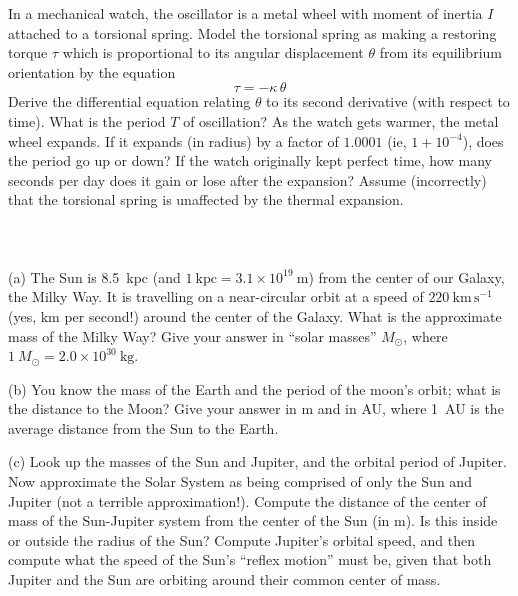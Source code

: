 \documentclass[12pt]{article}
\newcounter{problem}
\begin{document}
In a mechanical watch, the oscillator is a metal wheel with moment of
inertia $I$ attached to a torsional spring.  Model the torsional
spring as making a restoring torque $\tau$ which is proportional to
its angular displacement $\theta$ from its equilibrium orientation by
the equation
\begin{equation}
\tau = -\kappa\,\theta \nonumber
\end{equation}
Derive the differential equation relating $\theta$ to its second
derivative (with respect to time).  What is the period $T$ of
oscillation?  As the watch gets warmer, the metal wheel expands.  If
it expands (in radius) by a factor of $1.0001$ (ie, $1+10^{-4}$), does
the period go up or down?  If the watch originally kept perfect time,
how many seconds per day does it gain or lose after the expansion?
Assume (incorrectly) that the torsional spring is unaffected by the
thermal expansion.

\paragraph{\problemname~\theproblem}

(a) The Sun is 8.5~kpc (and $1~\mathrm{kpc}=3.1\times
10^{19}~\mathrm{m}$) from the center of our Galaxy, the Milky Way.  It
is travelling on a near-circular orbit at a speed of
$220~\mathrm{km\,s^{-1}}$ (yes, km per second!) around the center of
the Galaxy.  What is the approximate mass of the Milky Way?  Give your
answer in ``solar masses'' $M_\odot$, where $1~M_\odot= 2.0\times
10^{30}~\mathrm{kg}$.

(b) You know the mass of the Earth and the period of the moon's orbit;
what is the distance to the Moon?  Give your answer in m and in AU,
where 1~AU is the average distance from the Sun to the Earth.

(c) Look up the masses of the Sun and Jupiter, and the orbital period
of Jupiter.  Now approximate the Solar System as being comprised of
only the Sun and Jupiter (not a terrible approximation!).  Compute the
distance of the center of mass of the Sun-Jupiter system from the
center of the Sun (in m).  Is this inside or outside the radius of the
Sun?  Compute Jupiter's orbital speed, and then compute what the speed
of the Sun's ``reflex motion'' must be, given that both Jupiter and
the Sun are orbiting around their common center of mass.

\paragraph{\problemname~\theproblem}
\end{document}
